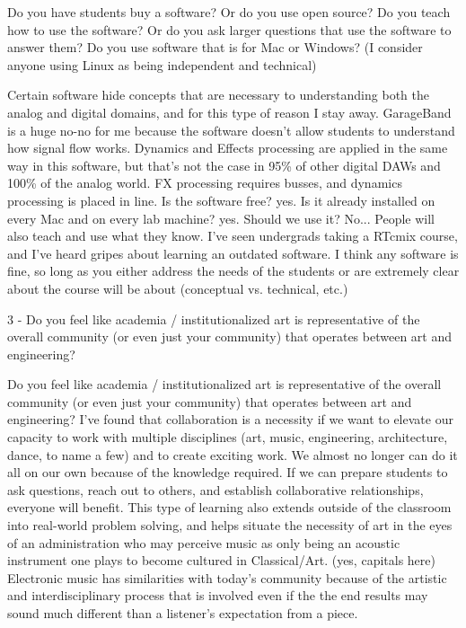 	Do you have students buy a software? Or do you use open source?
	Do you teach how to use the software? Or do you ask larger questions that use the software to answer them?
	Do you use software that is for Mac or Windows? (I consider anyone using Linux as being independent and technical)

	Certain software hide concepts that are necessary to understanding both the analog and digital domains, and for this type of reason I stay away.  GarageBand is a huge no-no for me because the software doesn't allow students to understand how signal flow works.  Dynamics and Effects processing are applied in the same way in this software, but that's not the case in 95\% of other digital DAWs and 100\% of the analog world.  FX processing requires busses, and dynamics processing is placed in line. Is the software free? yes.  Is it already installed on every Mac and on every lab machine? yes.  Should we use it?  No... 
	People will also teach and use what they know. I've seen undergrads taking a RTcmix course, and I've heard gripes about learning an outdated software. 
	I think any software is fine, so long as you either address the needs of the students or are extremely clear about the course will be about (conceptual vs. technical, etc.)

3 - Do you feel like academia / institutionalized art is representative of the overall community (or even just your community) that operates between art and engineering? 

Do you feel like academia / institutionalized art is representative of the overall community (or even just your community) that operates between art and engineering? 
	I've found that collaboration is a necessity if we want to elevate our capacity to work with multiple disciplines (art, music, engineering, architecture, dance, to name a few) and to create exciting work. We almost no longer can do it all on our own because of the knowledge required.  If we can prepare students to ask questions, reach out to others, and establish collaborative relationships, everyone will benefit.  This type of learning also extends outside of the classroom into real-world problem solving, and helps situate the necessity of art in the eyes of an administration who may perceive music as only being an acoustic instrument one plays to become cultured in Classical/Art. (yes, capitals here) Electronic music has similarities with today's community because of the artistic and interdisciplinary process that is involved even if the the end results may sound much different than a listener's expectation from a piece. 

